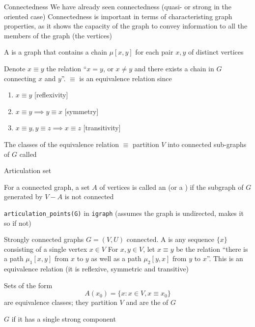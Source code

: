 \documentclass[aspectratio=43]{beamer}
\begin{document}
\begin{frame}{Connectedness}
We have already seen connectedness (quasi- or strong in the oriented case)
\vfill
Connectedness is important in terms of characteristing graph properties, as it shows the capacity of the graph to convey information to all the members of the graph (the vertices)
\end{frame}


\begin{frame}
	\begin{definition}
	A  is a graph that contains a chain $\mu[x,y]$ for each pair $x,y$ of distinct vertices
	\end{definition}
	\vfill
	Denote $x\equiv y$ the relation  ``$x=y$, or $x\neq y$ and there exists a chain in $G$ connecting $x$ and $y$''. $\equiv$ is an equivalence relation since
	\begin{enumerate}
		\item $x\equiv y$ \hfill[reflexivity]
		\item $x\equiv y\implies y\equiv x$ \hfill[symmetry]
		\item $x\equiv y, y\equiv z\implies x\equiv z$ \hfill[transitivity]
	\end{enumerate}
	\begin{definition}
	The classes of the equivalence relation $\equiv$ partition $V$ into connected sub-graphs of $G$ called 
	\end{definition}
	\end{frame}
	
\begin{frame}{Articulation set} 
	\begin{definition}
	For a connected graph, a set $A$ of vertices is called an  (or a ) if the subgraph of $G$ generated by $V-A$ is not connected
	\end{definition}
	\vfill
	{\tt articulation\_points(G)} in {\tt igraph} (assumes the graph is undirected, makes it so if not)
\end{frame}

	
	\begin{frame}{Strongly connected graphs}
		$G=(V,U)$ connected. 
		A  is any sequence $\{x\}$ consisting of a single vertex $x\in V$
		\vfill
		For $x,y\in V$, let $x\equiv y$ be the relation ``there is a path $\mu_1[x,y]$ from $x$ to $y$ as well as a path $\mu_2[y,x]$ from $y$ to $x$''. This is an equivalence relation (it is reflexive, symmetric and transitive)
		\vfill
		\begin{definition}\label{def:strong_components}
		Sets of the form 
		\[
		A(x_0)=\{x:x\in V, x\equiv x_0\}	
		\]
		are equivalence classes; they partition $V$ and are the  of $G$	
		\end{definition}
		\vfill
		\begin{definition}
		\label{def:strongly_connected_graph}
		$G$  if it has a single strong component
		\end{definition}
\end{frame}
		
\end{document}
